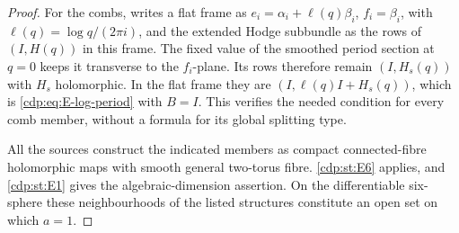 \begin{proof}
For the combs, \cite[Proposition labelled \texttt{periodextension},
case (i)]{Viaclovsky2026Combs} writes a flat frame as
$e_i=\alpha_i+\ell(q)\beta_i$, $f_i=\beta_i$, with
$\ell(q)=\log q/(2\pi i)$, and the extended Hodge subbundle as
the rows of $(I,H(q))$ in this frame. The fixed value of the
smoothed period section at $q=0$ keeps it transverse to the
$f_i$-plane. Its rows therefore remain $(I,H_s(q))$ with
$H_s$ holomorphic. In the flat frame they are
$(I,\ell(q)I+H_s(q))$, which is \eqref{cdp:eq:E-log-period} with
$B=I$. This verifies the needed condition for every comb member,
without a formula for its global splitting type.

All the sources construct the indicated members as compact
connected-fibre holomorphic maps with smooth general two-torus
fibre. \ref{cdp:st:E6} applies, and \ref{cdp:st:E1} gives the algebraic-dimension assertion.
On the differentiable six-sphere these neighbourhoods of the
listed structures constitute an open set on which $a=1$.
\end{proof}


